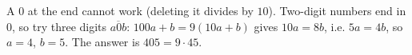 A $0$ at the end cannot work (deleting it divides by $10$). Two-digit numbers end in $0$, so try three digits $\overline{a0b}$: $100a+b=9(10a+b)$ gives $10a=8b$, i.e. $5a=4b$, so $a=4$, $b=5$. The answer is $\boxed{405}=9\cdot45$.
